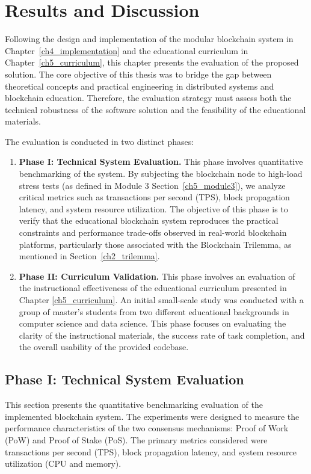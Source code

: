 \chapter{Results and Discussion} \label{ch6_evaluation}

Following the design and implementation of the modular blockchain system in Chapter~\ref{ch4_implementation} and the educational curriculum in Chapter~\ref{ch5_curriculum}, this chapter presents the evaluation of the proposed solution. The core objective of this thesis was to bridge the gap between theoretical concepts and practical engineering in distributed systems and blockchain education. Therefore, the evaluation strategy must assess both the technical robustness of the software solution and the feasibility of the educational materials.

The evaluation is conducted in two distinct phases:

\begin{enumerate}
    \item \textbf{Phase I: Technical System Evaluation.} This phase involves quantitative benchmarking of the system. By subjecting the blockchain node to high-load stress tests (as defined in Module 3 Section~\ref{ch5_module3}), we analyze critical metrics such as transactions per second (TPS), block propagation latency, and system resource utilization. The objective of this phase is to verify that the educational blockchain system reproduces the practical constraints and performance trade-offs observed in real-world blockchain platforms, particularly those associated with the Blockchain Trilemma, as mentioned in Section~\ref{ch2_trilemma}.
    \item \textbf{Phase II: Curriculum Validation.} This phase involves an evaluation of the instructional effectiveness of the educational curriculum presented in Chapter \ref{ch5_curriculum}. An initial small-scale study was conducted with a group of master's students from two different educational backgrounds in computer science and data science. This phase focuses on evaluating the clarity of the instructional materials, the success rate of task completion, and the overall usability of the provided codebase.
\end{enumerate}


\section{Phase I: Technical System Evaluation}
This section presents the quantitative benchmarking evaluation of the implemented blockchain system. The experiments were designed to measure the performance characteristics of the two consensus mechanisms: Proof of Work (PoW) and Proof of Stake (PoS). The primary metrics considered were transactions per second (TPS), block propagation latency, and system resource utilization (CPU and memory).

